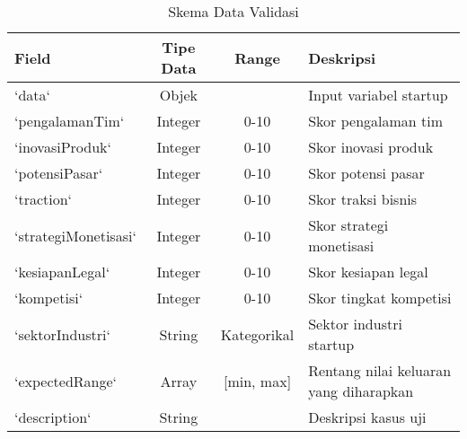 \documentclass[12pt,a4paper]{article}
\begin{document}
\begin{table}[htbp]
\centering
\caption{Skema Data Validasi}
\label{tab:validation-data-schema}
\begin{tabular}{@{}lccl@{}}
\toprule
\textbf{Field} & \textbf{Tipe Data} & \textbf{Range} & \textbf{Deskripsi} \\
\midrule
`data` & Objek & & Input variabel startup \\
\quad `pengalamanTim` & Integer & 0-10 & Skor pengalaman tim \\
\quad `inovasiProduk` & Integer & 0-10 & Skor inovasi produk \\
\quad `potensiPasar` & Integer & 0-10 & Skor potensi pasar \\
\quad `traction` & Integer & 0-10 & Skor traksi bisnis \\
\quad `strategiMonetisasi` & Integer & 0-10 & Skor strategi monetisasi \\
\quad `kesiapanLegal` & Integer & 0-10 & Skor kesiapan legal \\
\quad `kompetisi` & Integer & 0-10 & Skor tingkat kompetisi \\
\quad `sektorIndustri` & String & Kategorikal & Sektor industri startup \\
`expectedRange` & Array & [min, max] & Rentang nilai keluaran yang diharapkan \\
`description` & String & & Deskripsi kasus uji \\
\bottomrule
\end{tabular}
\end{table}
\end{document}
